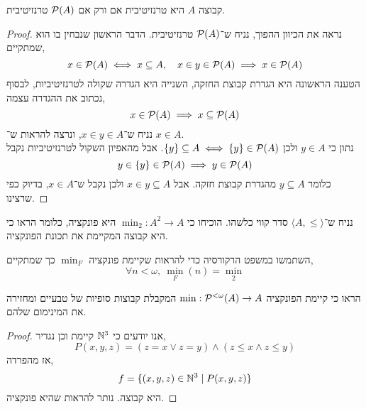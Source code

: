 



\begin{proposition}
	קבוצה $A$ היא טרנזיטיבית אם ורק אם $\mathcal{P}(A)$ טרנזיטיבית.
\end{proposition}
\begin{proof}
	נראה את הכיוון ההפוך, נניח ש־$\mathcal{P}(A)$ טרנזיטיבית.
	הדבר הראשון שנבחין בו הוא שמתקיים,
	\[
		x \in \mathcal{P}(A) \iff x \subseteq A,
		\quad
		x \in y \in \mathcal{P}(A) \implies x \in \mathcal{P}(A)
	\]
	הטענה הראשונה היא הגדרת קבוצת החזקה, השנייה היא הגדרה שקולה לטרנזיטיביות, לבסוף נכתוב את ההגדרה עצמה,
	\[
		x \in \mathcal{P}(A) \implies x \subseteq \mathcal{P}(A)
	\]
	נניח ש־$x \in y \in A$, ונרצה להראות ש־ $x \in A$. \\
	נתון כי $y \in A$ ולכן $\{ y \} \subseteq A \iff \{ y \} \in \mathcal{P}(A)$.
	אבל מהאפיון השקול לטרנזיטיביות נקבל
	\[
		y \in \{ y \} \in \mathcal{P}(A) \implies y \in \mathcal{P}(A)
	\]
	כלומר $y \subseteq A$ מהגדרת קבוצת חזקה.
	אבל $x \in y \subseteq A$ ולכן נקבל ש־$x \in A$, בדיוק כפי שרצינו.
\end{proof}
\begin{exercise}
	נניח ש־$\langle A, \le \rangle$ סדר קווי כלשהו.
	הוכיחו כי $\operatorname{min}_2 : A^2 \to A$ היא פונקציה, כלומר הראו כי היא קבוצה המקיימת את תכונת הפונקציה.
\end{exercise}
\begin{exercise}
	השתמשו במשפט הרקורסיה כדי להראות שקיימת פונקציה $\operatorname{min}_F$ כך שמתקיים,
	\[
		\forall n < \omega,\ 
		\operatorname{min}_F(n) = \operatorname{min}_2
	\]
\end{exercise}
\begin{exercise}
	הראו כי קיימת הפונקציה $\min : \mathcal{P}^{< \omega}(A) \to A$ המקבלת קבוצות סופיות של טבעיים ומחזירה את המינימום שלהם.
\end{exercise}
\begin{proof}
	אנו יודעים כי $\mathbb{N}^3$ קיימת וכן נגדיר,
	\[
		P(x, y, z)
		= (z = x \lor z = y) \land (z \le x \land z \le y)
	\]
	אז מהפרדה,
	\[
		f = \{ (x, y, z) \in \mathbb{N}^3 \mid P(x, y, z) \}
	\]
	היא קבוצה.
	נותר להראות שהיא פונקציה.
\end{proof}


